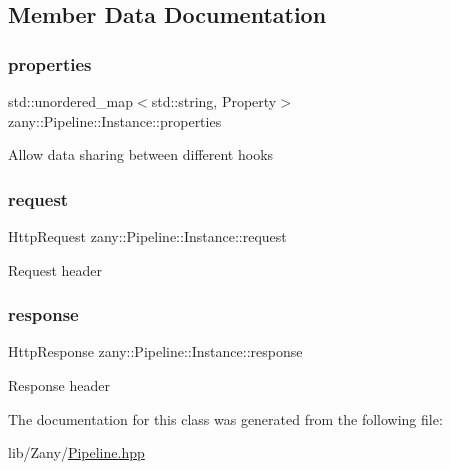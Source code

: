 \subsection{Member Data Documentation}
\mbox{\label{classzany_1_1_pipeline_1_1_instance_a98f29b395ee9292ce50d9d3665ad0713}} 
\subsubsection{\texorpdfstring{properties}{properties}}
{\footnotesize\ttfamily std\+::unordered\+\_\+map$<$std\+::string, Property$>$ zany\+::\+Pipeline\+::\+Instance\+::properties}

Allow data sharing between different hooks \mbox{\label{classzany_1_1_pipeline_1_1_instance_a1df80a693d2b107e79c7630fbc13209a}} 
\subsubsection{\texorpdfstring{request}{request}}
{\footnotesize\ttfamily Http\+Request zany\+::\+Pipeline\+::\+Instance\+::request}

Request header \mbox{\label{classzany_1_1_pipeline_1_1_instance_a85b0d65a24356836b8ff33b4bec9eeca}} 
\subsubsection{\texorpdfstring{response}{response}}
{\footnotesize\ttfamily Http\+Response zany\+::\+Pipeline\+::\+Instance\+::response}

Response header 

The documentation for this class was generated from the following file\+:\begin{DoxyCompactItemize}
\item 
lib/\+Zany/\hyperlink{_pipeline_8hpp}{Pipeline.\+hpp}\end{DoxyCompactItemize}
